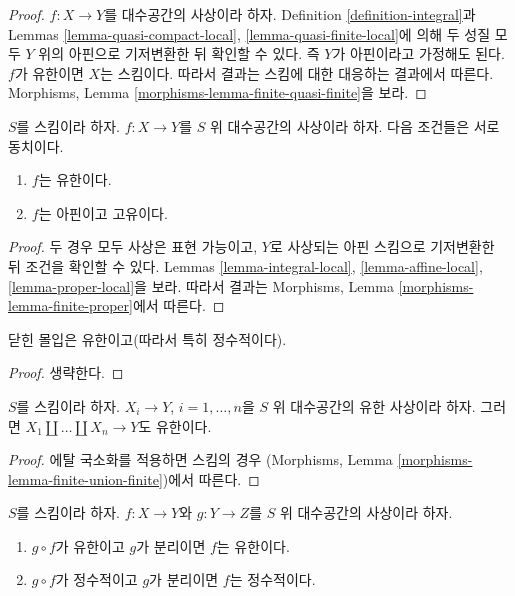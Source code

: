 \begin{proof}
$f : X \to Y$를 대수공간의 사상이라 하자.
Definition \ref{definition-integral}과 Lemmas
\ref{lemma-quasi-compact-local}, \ref{lemma-quasi-finite-local}에 의해 두
성질 모두 $Y$ 위의 아핀으로 기저변환한 뒤 확인할 수 있다. 즉 $Y$가
아핀이라고 가정해도 된다. $f$가 유한이면 $X$는 스킴이다. 따라서 결과는
스킴에 대한 대응하는 결과에서 따른다. Morphisms, Lemma
\ref{morphisms-lemma-finite-quasi-finite}을 보라.
\end{proof}

\begin{lemma}
\label{lemma-finite-proper}
$S$를 스킴이라 하자. $f : X \to Y$를 $S$ 위 대수공간의 사상이라 하자.
다음 조건들은 서로 동치이다.
\begin{enumerate}
\item $f$는 유한이다.
\item $f$는 아핀이고 고유이다.
\end{enumerate}
\end{lemma}

\begin{proof}
두 경우 모두 사상은 표현 가능이고, $Y$로 사상되는 아핀 스킴으로
기저변환한 뒤 조건을 확인할 수 있다. Lemmas
\ref{lemma-integral-local}, \ref{lemma-affine-local},
\ref{lemma-proper-local}을 보라. 따라서 결과는 Morphisms, Lemma
\ref{morphisms-lemma-finite-proper}에서 따른다.
\end{proof}

\begin{lemma}
\label{lemma-closed-immersion-finite}
닫힌 몰입은 유한이고(따라서 특히 정수적이다).
\end{lemma}

\begin{proof}
생략한다.
\end{proof}

\begin{lemma}
\label{lemma-finite-union-finite}
$S$를 스킴이라 하자.
$X_i \to Y$, $i = 1, \ldots, n$을 $S$ 위 대수공간의 유한 사상이라 하자.
그러면 $X_1 \amalg \ldots \amalg X_n \to Y$도 유한이다.
\end{lemma}

\begin{proof}
에탈 국소화를 적용하면 스킴의 경우
(Morphisms, Lemma \ref{morphisms-lemma-finite-union-finite})에서 따른다.
\end{proof}

\begin{lemma}
\label{lemma-finite-permanence}
$S$를 스킴이라 하자.
$f : X \to Y$와 $g : Y \to Z$를 $S$ 위 대수공간의 사상이라 하자.
\begin{enumerate}
\item $g \circ f$가 유한이고 $g$가 분리이면 $f$는 유한이다.
\item $g \circ f$가 정수적이고 $g$가 분리이면 $f$는 정수적이다.
\end{enumerate}
\end{lemma}

